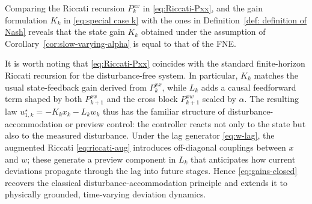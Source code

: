 \documentclass[letterpaper, 10 pt, conference]{ieeeconf}  %
\begin{document}
Comparing the Riccati recursion $P^{xx}_k$ in \eqref{eq:Riccati-Pxx}, and the gain formulation $K_k$ in \eqref{eq:special case k} with the ones in Definition~\ref{def: definition of Nash} reveals that the state gain $K_k$ obtained under the assumption of Corollary~\ref{cor:slow-varying-alpha} is equal to that of the FNE.  


It is worth noting that \eqref{eq:Riccati-Pxx} coincides with the standard finite-horizon Riccati recursion for the disturbance-free system. In particular, $K_k$ matches the usual state-feedback gain derived from $P_k^{xx}$, while $L_k$ adds a causal feedforward term shaped by both $P_{k+1}^{xx}$ and the cross block $P_{k+1}^{xw}$ scaled by $\alpha$. The resulting law $u_{1,k}^\star=-K_k x_k - L_k w_k$ thus has the familiar structure of disturbance-accommodation or preview control: the controller reacts not only to the state but also to the measured disturbance. Under the lag generator \eqref{eq:w-lag}, the augmented Riccati \eqref{eq:riccati-aug} introduces off-diagonal couplings between $x$ and $w$; these generate a preview component in $L_k$ that anticipates how current deviations propagate through the lag into future stages. Hence \eqref{eq:gains-closed} recovers the classical disturbance-accommodation principle and extends it to physically grounded, time-varying deviation dynamics.


\end{document}
